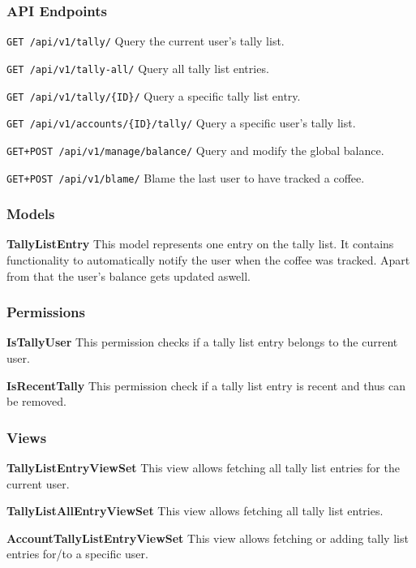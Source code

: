 \subsubsection{API Endpoints}\label{api-endpoints-3}

\texttt{GET\ /api/v1/tally/} Query the current user's tally list.

\texttt{GET\ /api/v1/tally-all/} Query all tally list entries.

\texttt{GET\ /api/v1/tally/\{ID\}/} Query a specific tally list entry.

\texttt{GET\ /api/v1/accounts/\{ID\}/tally/} Query a specific user's
tally list.

\texttt{GET+POST\ /api/v1/manage/balance/} Query and modify the global
balance.

\texttt{GET+POST\ /api/v1/blame/} Blame the last user to have tracked a
coffee.

\subsubsection{Models}\label{models-4}

\textbf{TallyListEntry} This model represents one entry on the tally
list. It contains functionality to automatically notify the user when
the coffee was tracked. Apart from that the user's balance gets updated
aswell.

\subsubsection{Permissions}\label{permissions-2}

\textbf{IsTallyUser} This permission checks if a tally list entry
belongs to the current user.

\textbf{IsRecentTally} This permission check if a tally list entry is
recent and thus can be removed.

\subsubsection{Views}\label{views-5}

\textbf{TallyListEntryViewSet} This view allows fetching all tally list
entries for the current user.

\textbf{TallyListAllEntryViewSet} This view allows fetching all tally
list entries.

\textbf{AccountTallyListEntryViewSet} This view allows fetching or
adding tally list entries for/to a specific user.

